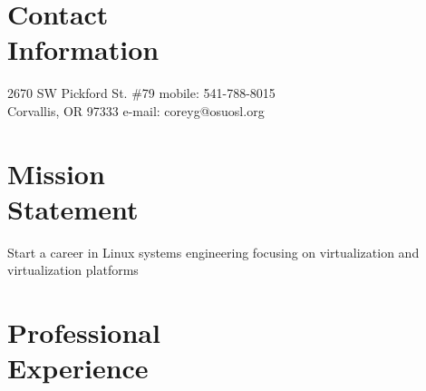 \documentclass[margin,line]{resume}
\begin{document}
\begin{resume}

    \section{\mysidestyle Contact\\Information}

    2670 SW Pickford St. \#79   \hfill mobile: 541-788-8015         \vspace{0mm}\\\vspace{0mm}%
    Corvallis, OR 97333         \hfill e-mail: coreyg@osuosl.org  \vspace{0mm}\\\vspace{-4.5mm}

    \section{\mysidestyle Mission\\Statement}

    Start a career in Linux systems engineering focusing on virtualization
    and virtualization platforms\\

    \section{\mysidestyle Professional\\Experience}


\end{resume}
\end{document}
